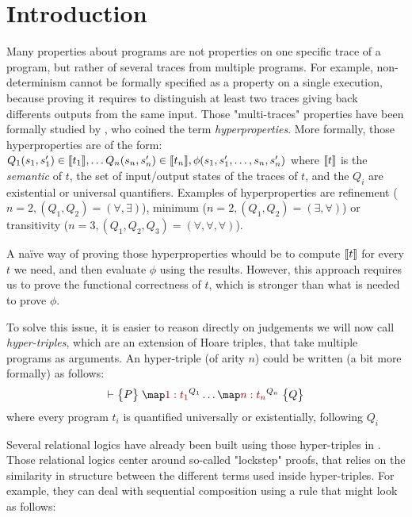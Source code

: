 \section{Introduction}
\label{sec:intro}

Many properties about programs are not properties on one specific trace of a program, but rather of several traces from multiple programs. For example, non-determinism cannot be formally specified as a property on a single execution, because proving it requires to distinguish at least two traces giving back differents outputs from the same input. Those "multi-traces" properties have been formally studied by \citet{ClarksonS08}, who coined the term \emph{hyperproperties}.
More formally, those hyperproperties are of the form:
\(
Q_1 (s_1, s'_1) \in \sem{t_1},
\dots
Q_n (s_n, s'_n) \in \sem{t_n},
\phi(s_1, s'_1, \dots, s_n, s'_n)
\)
where $\sem{t}$ is the \emph{semantic} of $t$, \ie the set of input/output states of the traces of $t$, and the $Q_i$ are existential or universal quantifiers. Examples of hyperproperties are refinement ($n = 2, (Q_1, Q_2) = (\forall, \exists)$), minimum ($n = 2, (Q_1, Q_2) = (\exists, \forall)$) or transitivity ($n = 3, (Q_1, Q_2, Q_3) = (\forall, \forall, \forall)$).

A naïve way of proving those hyperproperties whould be to compute $\sem{t}$ for every $t$ we need, and then evaluate $\phi$ using the results. However, this approach requires us to prove the functional correctness of $t$, which is stronger than what is needed to prove $\phi$.

To solve this issue, it is easier to reason directly on judgements we will now call \emph{hyper-triples}, which are an extension of Hoare triples, that take multiple programs as arguments. An hyper-triple (of arity $n$) could be written (a bit more formally) as follows:
\[
    \J |- {P} {\m[\I 1: t_1]^{Q_1} \dots \m[\I n: t_n]^{Q_n}} {Q}    
\]
where every program $t_i$ is quantified universally or existentially, following $Q_i$

Several relational logics have already been built using those hyper-triples in \cite{Yang07, SousaD16, Benton04, BartheCK16}. Those relational logics center around so-called "lockstep" proofs, that relies on the similarity in structure between the different terms used inside hyper-triples. For example, they can deal with sequential composition using a rule that might look as follows:

\begin{prooftree}
\end{prooftree}

